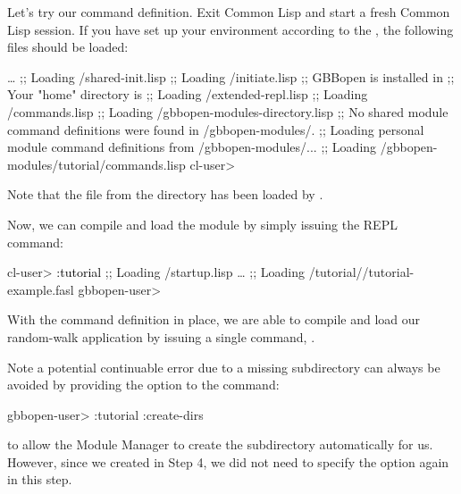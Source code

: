 \documentclass[10pt,twoside,english,pdftex]{article}
\begin{document}
Let's try our command definition.  Exit Common Lisp and start a fresh
Common Lisp session.  If you have set up your environment according to the
,
the following files should be loaded:
%
\W\supp
\begin{smallexample}
\textcolor{darkergray}{%
     \textrm{\ldots{}}
  ;; Loading /shared-init.lisp
  ;;   Loading /initiate.lisp
  ;; GBBopen is installed in 
  ;; Your "home" directory is 
  ;;     Loading /extended-repl.lisp
  ;;     Loading /commands.lisp
  ;;     Loading /gbbopen-modules-directory.lisp
  ;; No shared module command definitions were found in /gbbopen-modules/.
  ;; Loading personal module command definitions from /gbbopen-modules/...
  ;;     Loading /gbbopen-modules/tutorial/commands.lisp
  cl-user>}
\end{smallexample}
%
Note that the  file from the 
directory has been loaded by
.

Now, we can compile and load the  module by simply issuing the
 REPL command:
%
\W\supp
\begin{smallexample}
\textcolor{darkergray}{%
  cl-user> \textcolor{black}{:tutorial}
  ;; Loading /startup.lisp
     \textrm{\ldots{}}
  ;; Loading /tutorial//tutorial-example.fasl
  gbbopen-user>}
\end{smallexample}
%
With the command definition in place, we are able to compile and load our
random-walk application by issuing a single command, .

Note a potential continuable error due to a missing
 subdirectory can always be avoided by
providing the  option to the  command:
%
\W\supp
\begin{example}
\textcolor{darkergray}{%
  gbbopen-user> :tutorial :create-dirs}
\end{example}
%
to allow the Module Manager to create the 
subdirectory automatically for us.  However, since we created
 in Step 4, we did not need to specify the
 option again in this step.
\end{document}
